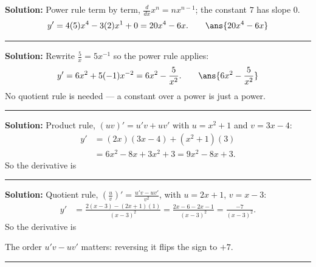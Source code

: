 \documentclass[12pt]{article}
\begin{document}



\textbf{Solution:} Power rule term by term, $\frac{d}{dx}x^n = nx^{n-1}$; the
constant $7$ has slope $0$.
\[
  y' = 4(5)x^4 - 3(2)x^1 + 0 = 20x^4 - 6x. \qquad \ans{20x^4 - 6x}
\]

\vspace{0.15cm}\noindent\rule{\linewidth}{0.2pt}\vspace{0.15cm}


\textbf{Solution:} Rewrite $\frac{5}{x} = 5x^{-1}$ so the power rule applies:
\[
  y' = 6x^2 + 5(-1)x^{-2} = 6x^2 - \frac{5}{x^2}. \qquad \ans{6x^2 - \dfrac{5}{x^2}}
\]
No quotient rule is needed --- a constant over a power is just a power.

\vspace{0.15cm}\noindent\rule{\linewidth}{0.2pt}\vspace{0.15cm}


\textbf{Solution:} Product rule, $(uv)' = u'v + uv'$ with $u = x^2+1$ and
$v = 3x-4$:
\begin{align*}
  y' &= (2x)(3x - 4) + \left(x^2+1\right)(3) \\
     &= 6x^2 - 8x + 3x^2 + 3 = 9x^2 - 8x + 3.
\end{align*}
So the derivative is 

\vspace{0.15cm}\noindent\rule{\linewidth}{0.2pt}\vspace{0.15cm}


\textbf{Solution:} Quotient rule,
$\left(\frac{u}{v}\right)' = \frac{u'v - uv'}{v^2}$, with $u = 2x+1$,
$v = x-3$:
\begin{align*}
  y' &= \frac{2(x-3) - (2x+1)(1)}{(x-3)^2}
      = \frac{2x - 6 - 2x - 1}{(x-3)^2} = \frac{-7}{(x-3)^2}.
\end{align*}
So the derivative is 

The order $u'v - uv'$ matters: reversing it flips the sign to $+7$.

\vspace{0.15cm}\noindent\rule{\linewidth}{0.2pt}\vspace{0.15cm}
\end{document}
